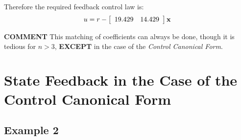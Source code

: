  

Therefore the required feedback control law is:
\[
u = r - \left[ {\begin{array}{*{20}c}
   {19.429} & {14.429}  \\
\end{array}} \right]{\bf{x}}
\]



\textbf{COMMENT}
This matching of coefficients can always be done, though it is tedious for $n>3$, \textbf{EXCEPT} in the case of the \emph{Control Canonical Form}.

 

\section*{State Feedback in the Case of the Control Canonical Form} %
\label{sec:state_feedback_in_the_case_of_the_control_canonical_form}



\ifslidesonly
\begin{slide}
   
\end{slide}
\fi




\ifslidesonly
\begin{slide}
   
\end{slide}
\begin{slide}
   
\end{slide}
\fi


 

\ifslidesonly
\begin{slide}
   
\end{slide}
\fi

 
\subsection*{Example 2} %
\label{sub:example_2}

